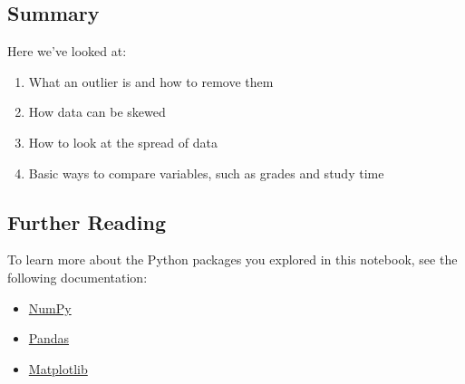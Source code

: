 \documentclass[11pt]{article}
\providecommand{\tightlist}{%
      \setlength{\itemsep}{0pt}\setlength{\parskip}{0pt}}
\begin{document}
\hypertarget{summary}{%
\subsection{Summary}\label{summary}}

Here we've looked at:

\begin{enumerate}
\def\labelenumi{\arabic{enumi}.}
\tightlist
\item
  What an outlier is and how to remove them
\item
  How data can be skewed
\item
  How to look at the spread of data
\item
  Basic ways to compare variables, such as grades and study time
\end{enumerate}

\hypertarget{further-reading}{%
\subsection{Further Reading}\label{further-reading}}

To learn more about the Python packages you explored in this notebook,
see the following documentation:

\begin{itemize}
\tightlist
\item
  \href{https://numpy.org/doc/stable/}{NumPy}
\item
  \href{https://pandas.pydata.org/pandas-docs/stable/}{Pandas}
\item
  \href{https://matplotlib.org/contents.html}{Matplotlib}
\end{itemize}


    
    
    
\end{document}
